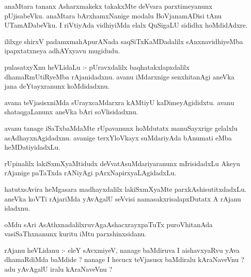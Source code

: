 \documentclass{article}
\begin{document}
\begin{mn}
anaMtara  tananx  Asharxmakekx  takakxMte  deVvara  parxtimeyanunx  pUjisabeVku.  
anaMtara  bArxhamxNanige  modalu  BoVjanamADisi  tAnu  UTamADabeVku.  I riVtiyAda  
vidhiyiMda  elalx  QuSigaLU  sididhx hoMdidAdxre.
\end{mn}

\begin{mn}
ililxge  shirxV padamxmahApurANada  saqSiTxKaMDadalilx  sAnxnavidhiyeMba  ipapxtatxneya  adhAYxyavu  mugidudu.
\end{mn}




\begin{mn}
pulasatxyXnu  heVLidaLu :- pUravxdalilx  baqhatakxlapxdalilx dhamaRmUtiRyeMba  
rAjanidadxnu.  avanu  iMdarxnige  senxhitanAgi  aneVka  jana  deYtayxranunx  koMdidadxnu.
\end{mn}

\begin{mn}
avana  teVjasisxniMda  sUrayxcaMdarxra  kAMtiyU  kaDimeyAgididxtu.  avanu  
shataqgaLanunx  aneVka bAri  soVlisidadxnu.
\end{mn}

\begin{mn}
avanu  tanage  iSaTxbaMdaMte  rUpavanunx  hoMdutatx  manuSayxrige  gelalxlu  
asAdhayxnAgidadxnu.  avanige  terxYloVkayx  suMdariyAda  bAnumati  eMba  heMDatiyidadxLu.
\end{mn}

\begin{mn}
rUpinalilx  lakiSxmXyaMtidudx  deVvatAsuMdariyaranunx  mIrisidadxLu  Akeyu  
rAjanige  paTaTxda  rANiyAgi  pArxNapirxyaLAgidadxLu.  
\end{mn}

\begin{mn}
hatutxsAvira  heMgasara  madhayxdalilx  lakiSxmXyaMte  parxkAshisutitxdadxLu.  aneVka  
koVTi  rAjariMda  yAvAgalU  seVvisi  namasakxrisalapxDutatx  A  rAjanu  idadxnu.
\end{mn}

\begin{mn}
oMdu sAri  AsAthxnadalilxruvAgaAshacxrayxpaTuTx  puroVhitanAda  vasiSaThxnanunx  
kuritu  iMtu  parxshinxsidanu.
\end{mn}

\begin{mn}
rAjanu  heVLidanu :- eleY  sAvxmiyeV,  nanage  baMdiruva  I  aishavxyaRvu  yAva  
dhamaRdiMda  baMdide ?  nanage  I  hecucx  teVjasusx  baMdiralu  kAraNaveVnu ?  
adu  yAvAgalU  iralu  kAraNaveVnu ?
\end{mn}
\end{document}
